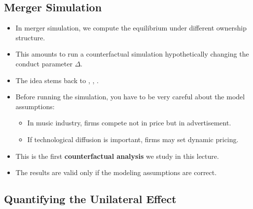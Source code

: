 \documentclass[
]{book}
\providecommand{\tightlist}{%
  \setlength{\itemsep}{0pt}\setlength{\parskip}{0pt}}
\begin{document}
\hypertarget{merger-simulation-1}{%
\subsection{Merger Simulation}\label{merger-simulation-1}}

\begin{itemize}
\tightlist
\item
  In merger simulation, we compute the equilibrium under different ownership structure.
\item
  This amounts to run a counterfactual simulation hypothetically changing the conduct parameter \(\Delta\).
\item
  The idea stems back to \citet{Farrell1990}, \citet{Werden1994}, \citet{Hausman1994}.
\item
  Before running the simulation, you have to be very careful about the model assumptions:

  \begin{itemize}
  \tightlist
  \item
    In music industry, firms compete not in price but in advertisement.
  \item
    If technological diffusion is important, firms may set dynamic pricing.
  \end{itemize}
\item
  This is the first \textbf{counterfactual analysis} we study in this lecture.
\item
  The results are valid only if the modeling assumptions are correct.
\end{itemize}

\hypertarget{quantifying-the-unilateral-effect}{%
\subsection{Quantifying the Unilateral Effect}\label{quantifying-the-unilateral-effect}}
\end{document}
